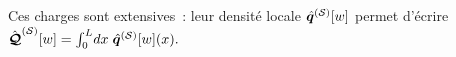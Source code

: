 Ces charges sont extensives : leur densité locale $\hat{\bm{q}}^{(\mathcal{S})}[w]$ permet d’écrire
\(
  \hat{\bm{\mathcal{Q}}}^{(\mathcal{S})}[w]=\int_0^{L}\!dx\;\hat{\bm{q}}^{(\mathcal{S})}[w](x).
\)




	
	

